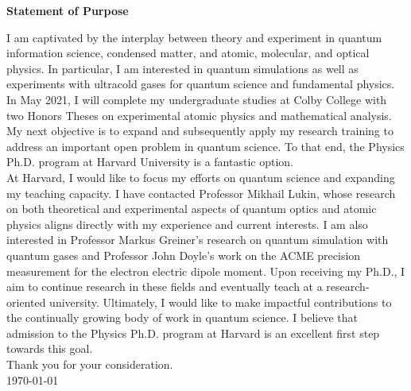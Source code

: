 \documentclass[12pt]{article}
\begin{document}
\begin{center}
	\textbf{Statement of Purpose}
\end{center}
I am captivated by the interplay between theory and experiment in quantum information science, condensed matter, and atomic, molecular, and optical physics. In particular, I am interested in  quantum simulations as well as experiments with ultracold gases for quantum science and fundamental physics. In May 2021, I will complete my undergraduate studies at Colby College with two Honors Theses on experimental atomic physics and mathematical analysis. My next objective is to expand and subsequently apply my research training to address an important open problem in quantum science. To that end, the Physics Ph.D. program at Harvard University is a fantastic option.  \\ 

 


At Harvard, I would like to focus my efforts on quantum science and expanding my teaching capacity. I have contacted Professor Mikhail Lukin, whose research on both theoretical and experimental aspects of quantum optics and atomic physics aligns directly with my experience and current interests. I am also interested in Professor Markus Greiner's research on quantum simulation with quantum gases and Professor John Doyle's work on the ACME precision measurement for the electron electric dipole moment. Upon receiving my Ph.D., I aim to continue research in these fields and eventually teach at a research-oriented university. Ultimately, I would like to make impactful contributions to the continually growing body of work in quantum science. I believe that admission to the Physics Ph.D. program at Harvard is an excellent first step towards this goal. \\


\noindent Thank you for your consideration. \\

\noindent \today
	











	
	
	
	
	
\end{document}
